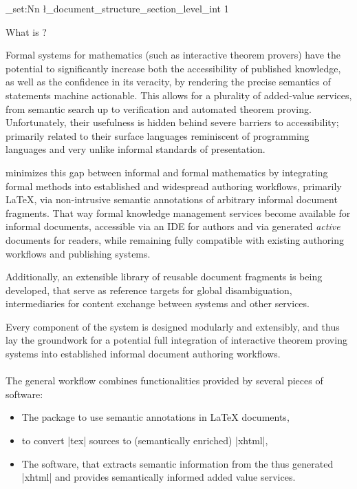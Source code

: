 \ExplSyntaxOn
\int_set:Nn \l_document_structure_section_level_int {1}
\ExplSyntaxOff

\clearpage

{%
  \def\\{:}%
  \tableofcontents
}

\clearpage
{}
	
\fi

\long{}

\begin{sfragment}{What is \sTeX?}
  
Formal systems for mathematics (such as interactive theorem provers)
have the potential to significantly increase both the accessibility
of published knowledge, as well as the confidence in its veracity,
by rendering the precise semantics of statements machine actionable.
This allows for a plurality of added-value services, from semantic
search up to verification and automated theorem proving.
Unfortunately, their usefulness is hidden behind severe barriers
to accessibility; primarily related to their surface languages
reminiscent of programming languages and very unlike informal
standards of presentation.

\sTeX minimizes this gap between informal and formal 
mathematics by integrating formal methods into established
and widespread authoring workflows, primarily \LaTeX, via 
non-intrusive semantic
annotations of arbitrary informal document fragments. That way
formal knowledge management services become available for informal
documents, accessible via an IDE for authors and via generated
\emph{active} documents for readers, while remaining fully compatible
with existing authoring workflows and publishing systems.

Additionally, an extensible library of reusable
document fragments is being developed, that serve as reference targets
for global disambiguation, intermediaries for content exchange
between systems and other services.

Every component of the system is designed modularly and extensibly,
and thus lay the groundwork for a potential full integration of
interactive theorem proving systems into established informal document
authoring workflows.

\paragraph{} The general \sTeX workflow combines functionalities
provided by several pieces of software:
\begin{itemize}
  \item The \sTeX package to use semantic annotations in
    {\LaTeX} documents,
  \item \RusTeX to convert |tex| sources to (semantically enriched)
    |xhtml|,
  \item The \mmt software, that extracts semantic information
    from the thus generated |xhtml| and provides semantically informed
    added value services.
\end{itemize}



\end{sfragment}
